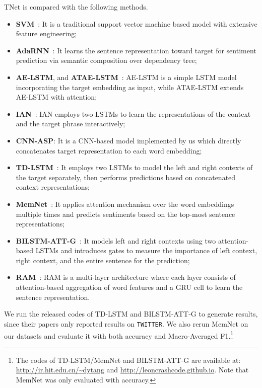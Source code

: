 \documentclass[11pt,a4paper]{article}
\begin{document}
TNet is compared with the following methods.
\begin{itemize}
\item \textbf{SVM}~\cite{kiritchenko-EtAl:2014:SemEval}: It is a traditional support vector machine based model with extensive feature engineering;
\item \textbf{AdaRNN}~\cite{dong-EtAl:2014:P14-2}: It learns the sentence representation toward target for sentiment prediction via semantic composition over dependency tree; 
\item \textbf{AE-LSTM}, and \textbf{ATAE-LSTM}~\cite{wang-EtAl:2016:EMNLP20163}: AE-LSTM is a simple LSTM model incorporating the target embedding as input, while ATAE-LSTM extends AE-LSTM with attention;
\item  \textbf{IAN}~\cite{ma2017interactive}: IAN employs two LSTMs to learn the representations of the context and the target phrase interactively;
\item \textbf{CNN-ASP}: It is a CNN-based model implemented by us which directly concatenates target representation to each word embedding;
\item  \textbf{TD-LSTM}~\cite{tang-EtAl:2016:COLING3}: It employs two LSTMs to model the left and right contexts of the target separately, then performs predictions based on concatenated context representations;
\item  \textbf{MemNet}~\cite{tang-qin-liu:2016:EMNLP2016}: It applies attention mechanism over the word embeddings multiple times and predicts sentiments based on the top-most sentence representations;
\item \textbf{BILSTM-ATT-G}~\cite{liu-zhang:2017:EACLshort}: It models left and right contexts using two attention-based LSTMs and introduces gates to measure the importance of left context, right context, and the entire sentence for the prediction;
\item  \textbf{RAM}~\cite{chen-EtAl:2017:EMNLP20171}: RAM is a multi-layer architecture where each layer consists of attention-based aggregation of word features and a GRU cell to learn the sentence representation. 
\end{itemize}


We run the released codes of TD-LSTM and BILSTM-ATT-G to generate results, since their papers only reported results on \texttt{TWITTER}. We also rerun MemNet on our datasets and evaluate it with both accuracy and Macro-Averaged F1.\footnote{The codes of TD-LSTM/MemNet and BILSTM-ATT-G are available at: \url{http://ir.hit.edu.cn/~dytang} and \url{http://leoncrashcode.github.io}. Note that MemNet was only evaluated with accuracy.}
\end{document}
